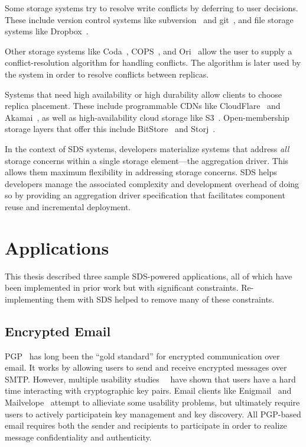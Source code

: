 Some storage systems try to resolve write conflicts by deferring to user
decisions.  These include version control systems like
subversion~\cite{subversion} and git~\cite{git}, and file storage systems like
Dropbox~\cite{dropbox}.

Other storage systems like Coda~\cite{coda}, COPS~\cite{cops}, and
Ori~\cite{ori} allow the user to supply a conflict-resolution algorithm for
handling conflicts.  The algorithm is later used by the system in order to
resolve conflicts between replicas.

Systems that need high availability or high durability allow clients to choose
replica placement.  These include programmable CDNs like
CloudFlare~\cite{cloudflare} and Akamai~\cite{akamai}, as well as
high-availability cloud storage like S3~\cite{s3}.  Open-membership storage
layers that offer this include BitStore~\cite{bitstore} and Storj~\cite{storj}.

In the context of SDS systems, developers materialize systems that address
\emph{all} storage concerns within a single storage element---the aggregation
driver.  This allows them maximum flexibility in addressing storage concerns.
SDS helps developers manage the associated complexity and development overhead
of doing so by providing an aggregation driver specification that facilitates
component reuse and incremental deployment.

\section{Applications}

This thesis described three sample SDS-powered applications, all of which have been
implemented in prior work but with significant constraints.  Re-implementing
them with SDS helped to remove many of these constraints.

\subsection{Encrypted Email}

PGP~\cite{pgp} has long been the ``gold standard'' for encrypted communication
over email.  It works by allowing users to send and receive encrypted messages
over SMTP.  However, multiple usability
studies~\cite{why-johnny-cant-encrypt}~\cite{why-johnny-still-still-cant-encrypt}
have shown that users have a hard time interacting with cryptographic key pairs.
Email clients like Enigmail~\cite{enigmail} and Mailvelope~\cite{mailvelope}
attempt to allieviate some usability problems, but ultimately require users to
actively participatein key management and key discovery.  All PGP-based email
requires both the sender and recipients to participate in order to realize
message confidentiality and authenticity.

